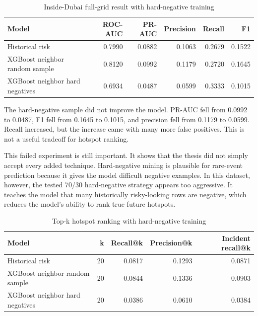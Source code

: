 \begin{table}[H]
\centering
\caption{Inside-Dubai full-grid result with hard-negative training}
\label{tab:hard_negative_training_metrics}
\footnotesize
\begin{tabularx}{\textwidth}{L{0.34\textwidth}rrrrr}
\toprule
\textbf{Model} & \textbf{ROC-AUC} & \textbf{PR-AUC} & \textbf{Precision} & \textbf{Recall} & \textbf{F1} \\
\midrule
Historical risk & 0.7990 & 0.0882 & 0.1063 & 0.2679 & 0.1522 \\
XGBoost neighbor random sample & 0.8120 & 0.0992 & 0.1179 & 0.2720 & 0.1645 \\
XGBoost neighbor hard negatives & 0.6934 & 0.0487 & 0.0599 & 0.3333 & 0.1015 \\
\bottomrule
\end{tabularx}
\end{table}

The hard-negative sample did not improve the model. PR-AUC fell from 0.0992 to 0.0487, F1 fell from 0.1645 to 0.1015, and precision fell from 0.1179 to 0.0599. Recall increased, but the increase came with many more false positives. This is not a useful tradeoff for hotspot ranking.

This failed experiment is still important. It shows that the thesis did not simply accept every added technique. Hard-negative mining is plausible for rare-event prediction because it gives the model difficult negative examples. In this dataset, however, the tested 70/30 hard-negative strategy appears too aggressive. It teaches the model that many historically risky-looking rows are negative, which reduces the model's ability to rank true future hotspots.

\begin{table}[H]
\centering
\caption{Top-k hotspot ranking with hard-negative training}
\label{tab:hard_negative_training_topk}
\small
\begin{tabular}{lrrrr}
\toprule
\textbf{Model} & \textbf{k} & \textbf{Recall@k} & \textbf{Precision@k} & \textbf{Incident recall@k} \\
\midrule
Historical risk & 20 & 0.0817 & 0.1293 & 0.0871 \\
XGBoost neighbor random sample & 20 & 0.0844 & 0.1336 & 0.0903 \\
XGBoost neighbor hard negatives & 20 & 0.0386 & 0.0610 & 0.0384 \\
\bottomrule
\end{tabular}
\end{table}


